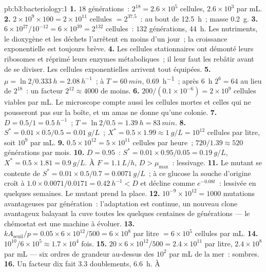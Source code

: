 \begin{solution}{pb:b3:bacteriology:1}
\textbf{1.} $18$ générations~: $2^{18} = 2.6\times 10^{5}$ cellules,
$2.6\times 10^{3}$ par mL.
\textbf{2.} $2\times 10^{9}\times 100 = 2\times 10^{11}$ cellules $=
2^{37.5}$~: au bout de \qty{12.5}{h}~; masse \qty{0.2}{g}.
\textbf{3.} $6\times 10^{27}/10^{-12} = 6\times 10^{39} = 2^{132}$
cellules~: $132$ générations, \qty{44}{h}. Les nutriments, le dioxygène
et les déchets l'arrêtent en moins d'un jour~; la croissance
exponentielle est toujours brève.
\textbf{4.} Les cellules stationnaires ont démonté leurs ribosomes et
réprimé leurs enzymes métaboliques~; il leur faut les rebâtir avant de
se diviser. Les cellules exponentielles arrivent tout équipées.
\textbf{5.} $\mu = \ln 2/\qty{0.333}{h} = \qty{2.08}{h^{-1}}$~; à $T =
\qty{60}{min}$, \qty{0.69}{h^{-1}}~; après \qty{6}{h} $2^{6} = 64$ au
lieu de $2^{18}$~: un facteur $2^{12} \approx 4000$ de moins.
\textbf{6.} $200/(0.1\times 10^{-6}) = 2\times 10^{9}$ cellules viables
par mL. Le microscope compte aussi les cellules mortes et celles qui ne
pousseront pas sur la boîte, et un amas ne donne qu'une colonie.
\textbf{7.} $D = 0.5/1 = \qty{0.5}{h^{-1}}$~; $T = \ln 2/0.5 =
\qty{1.39}{h} = \qty{83}{min}$.
\textbf{8.} $S^{*} = 0.01\times 0.5/0.5 = \qty{0.01}{g/L}$~; $X^{*} =
0.5\times 1.99 \approx \qty{1}{g/L} = 10^{12}$ cellules par litre, soit
$10^{9}$ par mL.
\textbf{9.} $0.5\times 10^{12} = 5\times 10^{11}$ cellules par heure~;
$720/1.39
\approx 520$ générations par mois.
\textbf{10.} $D = 0.95$~: $S^{*} = 0.01\times 0.95/0.05 = \qty{0.19}{g/L}$,
$X^{*} = 0.5\times 1.81 = \qty{0.9}{g/L}$. À $F = \qty{1.1}{L/h}$, $D
> \mu_{\max}$~: lessivage.
\textbf{11.} Le mutant se contente de $S^{*} = 0.01\times 0.5/0.7 = \qty{0.0071}{g/L}$~;
à ce glucose la souche d'origine croît à $1.0\times 0.0071/0.0171 =
\qty{0.42}{h^{-1}} < D$ et décline comme $e^{-0.08t}$~: lessivée en
quelques semaines. Le mutant prend la place.
\textbf{12.} $10^{-9}\times 10^{12} = 1000$ mutations avantageuses par
génération~: l'adaptation est continue, un nouveau clone avantageux
balayant la cuve toutes les quelques centaines de générations --- le
chémostat est une machine à évoluer.
\textbf{13.} $kA_{\text{seuil}}/p = 0.05\times 6\times 10^{12}/500 =
6\times 10^{8}$ par litre $= 6\times 10^{5}$ cellules par mL.
\textbf{14.} $10^{10}/6\times 10^{5} \approx 1.7\times 10^{4}$ fois.
\textbf{15.} $20\times 6\times 10^{12}/500 = 2.4\times 10^{11}$ par
litre, $2.4\times 10^{8}$ par mL --- six ordres de grandeur au-dessus
des $10^{2}$ par mL de la mer~: sombres.
\textbf{16.} Un facteur dix fait $3.3$ doublements, \qty{6.6}{h}. À

\end{solution}

